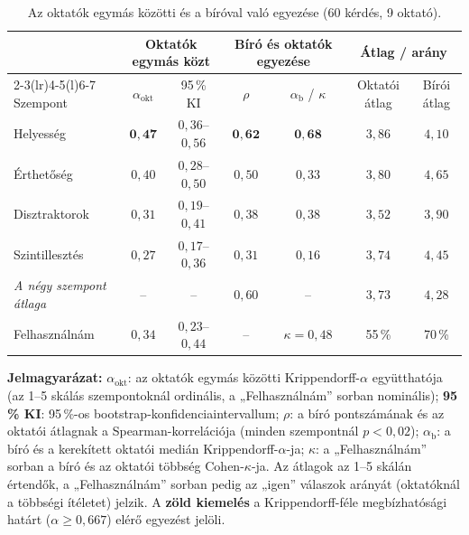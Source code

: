 \begin{table}[H]
\centering
\caption{Az oktatók egymás közötti és a bíróval való egyezése (60 kérdés, 9 oktató).}
\label{tab:oktatoi}
\small
\setlength{\tabcolsep}{3.8pt}
\begin{tabular}{@{}lcccccc@{}}
\toprule
 & \multicolumn{2}{c}{\textbf{Oktatók egymás közt}} & \multicolumn{2}{c}{\textbf{Bíró és oktatók egyezése}} & \multicolumn{2}{c}{\textbf{Átlag / arány}} \\
\cmidrule(lr){2-3}\cmidrule(lr){4-5}\cmidrule(l){6-7}
Szempont & $\alpha_{\mathrm{okt}}$ & 95\,\% KI & $\rho$ & $\alpha_{\mathrm{b}}$ / $\kappa$ & Oktatói átlag & Bírói átlag \\
\midrule
Helyesség       & $\mathbf{0{,}47}$ & $0{,}36$--$0{,}56$ & $\mathbf{0{,}62}$ & \cellcolor[HTML]{E6F4EA}$\mathbf{0{,}68}$ & $3{,}86$ & $4{,}10$ \\
Érthetőség      & $0{,}40$ & $0{,}28$--$0{,}50$ & $0{,}50$ & $0{,}33$ & $3{,}80$ & $4{,}65$ \\
Disztraktorok   & $0{,}31$ & $0{,}19$--$0{,}41$ & $0{,}38$ & $0{,}38$ & $3{,}52$ & $3{,}90$ \\
Szintillesztés  & $0{,}27$ & $0{,}17$--$0{,}36$ & $0{,}31$ & $0{,}16$ & $3{,}74$ & $4{,}45$ \\
\midrule
\emph{A négy szempont átlaga} & -- & --        & $0{,}60$ & --       & $3{,}73$ & $4{,}28$ \\
Felhasználnám   & $0{,}34$ & $0{,}23$--$0{,}44$ & --       & $\kappa=0{,}48$ & 55\,\% & 70\,\% \\
\bottomrule
\end{tabular}

\vspace{4pt}
\begin{minipage}{\textwidth}
\footnotesize\noindent\textbf{Jelmagyarázat:}
$\alpha_{\mathrm{okt}}$: az oktatók egymás közötti Krippendorff-$\alpha$ együtthatója (az 1--5 skálás szempontoknál ordinális, a „Felhasználnám” sorban nominális);
\textbf{95\,\% KI}: 95\,\%-os bootstrap-konfidenciaintervallum;
$\rho$: a bíró pontszámának és az oktatói átlagnak a Spearman-korrelációja (minden szempontnál $p < 0{,}02$);
$\alpha_{\mathrm{b}}$: a bíró és a kerekített oktatói medián Krippendorff-$\alpha$-ja;
$\kappa$: a „Felhasználnám” sorban a bíró és az oktatói többség Cohen-$\kappa$-ja.
Az átlagok az 1--5 skálán értendők, a „Felhasználnám” sorban pedig az „igen” válaszok arányát (oktatóknál a többségi ítéletet) jelzik.
A \setlength{\fboxsep}{1.5pt}\colorbox[HTML]{E6F4EA}{\textbf{zöld kiemelés}} a Krippendorff-féle megbízhatósági határt ($\alpha \ge 0{,}667$) elérő egyezést jelöli.
\end{minipage}
\end{table}

